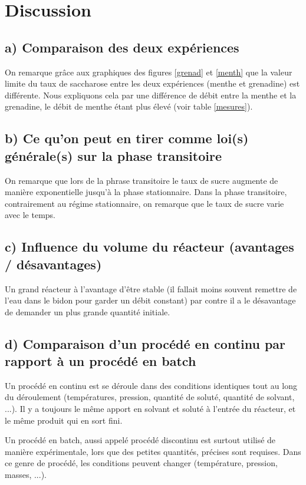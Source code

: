 \documentclass[a4paper,11pt, french]{article}
\begin{document}
		

\section{Discussion}
	\subsection*{a) Comparaison des deux expériences}
On remarque grâce aux graphiques des figures \ref{grenad} et \ref{menth} que la valeur limite du taux de saccharose entre les deux expériences (menthe et grenadine) est différente. Nous expliquons cela par une différence de débit entre la menthe et la grenadine, le débit de menthe étant plus élevé (voir table \ref{mesures}).

	\subsection*{b) Ce qu'on peut en tirer comme loi(s) générale(s) sur la phase transitoire}
On remarque que lors de la phrase transitoire le taux de sucre augmente de manière exponentielle jusqu'à la phase stationnaire. Dans la phase transitoire, contrairement au régime stationnaire, on remarque que le taux de sucre varie avec le temps.

	\subsection*{c) Influence du volume du réacteur (avantages / désavantages)}

Un grand réacteur à l'avantage d'être stable (il fallait moins souvent remettre de l'eau dans le bidon pour garder un débit constant) par contre il a le désavantage de demander un plus grande quantité initiale.

	\subsection*{d) Comparaison d'un procédé en continu par rapport à un procédé en batch}
Un procédé en continu est se déroule dans des conditions identiques tout au long du déroulement (températures, pression, quantité de soluté, quantité de solvant, ...). Il y a toujours le même apport en solvant et soluté à l'entrée du réacteur, et le même produit qui en sort fini.

Un procédé en batch, aussi appelé procédé discontinu est surtout utilisé de manière expérimentale, lors que des petites quantités, précises sont requises. Dans ce genre de procédé, les conditions peuvent changer (température, pression, masses, ...).
\end{document}
